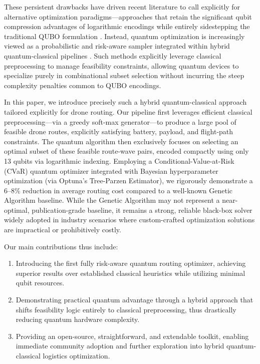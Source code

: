 These persistent drawbacks have driven recent literature to call explicitly for alternative 
optimization paradigms---approaches that retain the significant qubit compression advantages 
of logarithmic encodings while entirely sidestepping the traditional QUBO formulation 
\cite{chang2025, gabbassov2023, fuchs2022}. Instead, quantum optimization is increasingly 
viewed as a probabilistic and risk-aware sampler integrated within hybrid quantum-classical 
pipelines \cite{matsuyama2025, albarran2024}. Such methods explicitly leverage classical 
preprocessing to manage feasibility constraints, allowing quantum devices to specialize 
purely in combinational subset selection without incurring the steep complexity penalties 
common to QUBO encodings.

In this paper, we introduce precisely such a hybrid quantum-classical approach tailored 
explicitly for drone routing. Our pipeline first leverages efficient classical 
preprocessing---via a greedy soft-max generator---to produce a large pool of feasible 
drone routes, explicitly satisfying battery, payload, and flight-path constraints. The 
quantum algorithm then exclusively focuses on selecting an optimal subset of these feasible 
route-wave pairs, encoded compactly using only 13 qubits via logarithmic indexing. 
Employing a Conditional-Value-at-Risk (CVaR) quantum optimizer 
\cite{barkoutsos_improving_2020} integrated with Bayesian hyperparameter optimization 
(via Optuna's Tree-Parzen Estimator), we rigorously demonstrate a 6--8\% reduction in 
average routing cost compared to a well-known Genetic Algorithm baseline. While the 
Genetic Algorithm may not represent a near-optimal, publication-grade baseline, it remains 
a strong, reliable black-box solver widely adopted in industry scenarios where 
custom-crafted optimization solutions are impractical or prohibitively costly.

Our main contributions thus include:
\begin{enumerate}
\item Introducing the first fully risk-aware quantum routing optimizer, achieving superior 
results over established classical heuristics while utilizing minimal qubit resources.
\item Demonstrating practical quantum advantage through a hybrid approach that shifts 
feasibility logic entirely to classical preprocessing, thus drastically reducing quantum 
hardware complexity.
\item Providing an open-source, straightforward, and extendable toolkit, enabling immediate 
community adoption and further exploration into hybrid quantum-classical logistics 
optimization.
\end{enumerate}

